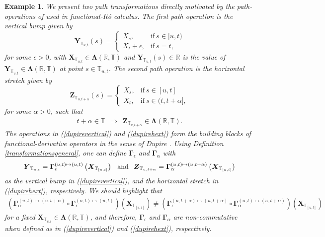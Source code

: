 \documentclass[12pt,a4paper]{article}
\newtheorem{ex}[thm]{Example}
\def\R{\mathbb{R}}
\def\T{\mathbb{T}}
\begin{document}
\begin{ex}
\emph{We present two path transformations directly motivated by the path-operations of \cite{Dupire 2009, Cont Fournie 2010} used in functional-It\^o calculus. The first path operation is the \emph{vertical bump} given by
\begin{equation}
\label{dupirevertical}
    \boldsymbol{Y}_{\T_{u,t}}(s) =
\begin{cases}
      X_s, & \text{if}\ s\in [u,t) \\
      X_t + \epsilon, & \text{if}\ s = t,
\end{cases}
\end{equation}
for some $\epsilon > 0$, with $\boldsymbol{X}_{\T_{u,t}}\in \boldsymbol{\Lambda}(\R , \T)$ and $\boldsymbol{Y}_{\T_{u,t}}(s)\in\R$ is the value of $\boldsymbol{Y}_{\T_{u,t}}\in \boldsymbol{\Lambda}(\R , \T)$ at point $s\in\T_{u,t}$. The second path operation is the \emph{horizontal stretch} given by
\begin{equation}
\label{dupirehext}
    \boldsymbol{Z}_{\T_{u, t + \alpha}}(s) =
\begin{cases}
			X_s, & \text{if}\ s\in [u,t] \\
      X_t, & \text{if}\ s\in(t,t+\alpha],
\end{cases}
\end{equation}
for some $\alpha> 0$, such that
\begin{align}
t+\alpha \in \T \,\,\, \Rightarrow \,\,\, \boldsymbol{Z}_{\T_{u,t+\alpha}}\in \boldsymbol{\Lambda}(\R , \T). 
\end{align}
The operations in (\ref{dupirevertical}) and (\ref{dupirehext}) form the building blocks of functional-derivative operators in the sense of Dupire \cite{Dupire 2009}. Using Definition \ref{transformationsgeneral}, one can define $\boldsymbol{\Gamma}_{\epsilon}$ and $\boldsymbol{\Gamma}_{\alpha}$ with
\begin{align}
\boldsymbol{Y}_{\T_{u,t}} = \boldsymbol{\Gamma}_{\epsilon}^{(u,t)\mapsto(u,t)}\left( \boldsymbol{X}_{\T_{[u,t]}}\right) \hspace{0.1in} \text{and} \hspace{0.1in}\boldsymbol{Z}_{\T_{u,t+\alpha}} = \boldsymbol{\Gamma}_{\alpha}^{(u,t)\mapsto(u,t+\alpha)}\left( \boldsymbol{X}_{\T_{[u,t]}}\right) 
\end{align}
as the \emph{vertical bump} in (\ref{dupirevertical}), and the \emph{horizontal stretch} in (\ref{dupirehext}), respectively. We should highlight that
\begin{align}
\left(  \boldsymbol{\Gamma}_{\alpha}^{(u,t)\mapsto(u,t+\alpha)}  \circ  \boldsymbol{\Gamma}_{\epsilon}^{(u,t)\mapsto(u,t)} \right) \left( \boldsymbol{X}_{\T_{[u,t]}}\right) \neq \left( \boldsymbol{\Gamma}_{\epsilon}^{(u,t+\alpha)\mapsto(u,t+\alpha)}  \circ  \boldsymbol{\Gamma}_{\alpha}^{(u,t)\mapsto(u,t+\alpha)} \right) \left( \boldsymbol{X}_{\T_{[u,t]}}\right)
\end{align}
for a fixed $\boldsymbol{X}_{\T_{u,t}}\in \boldsymbol{\Lambda}(\R , \T)$, and therefore, $\boldsymbol{\Gamma}_{\epsilon}$ and $\boldsymbol{\Gamma}_{\alpha}$ are \emph{non-commutative} when defined as in (\ref{dupirevertical}) and (\ref{dupirehext}), respectively.}
\end{ex}
\end{document}
